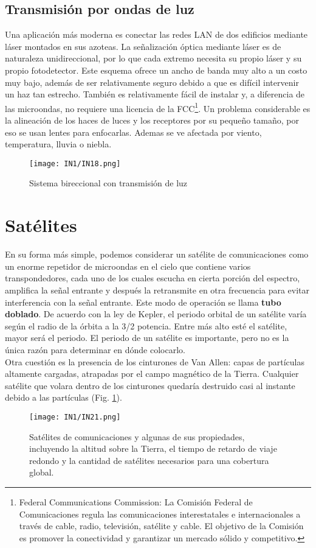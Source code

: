 \documentclass[
	12pt, %
	fleqn, %
	a4paper, %
	oneside, %
]{LegrandOrangeBook}
\begin{document}
\subsection{Transmisión por ondas de luz}
Una aplicación más moderna es conectar las redes LAN de dos edificios mediante láser montados en sus azoteas. La señalización óptica mediante láser es de naturaleza unidireccional, por lo que
cada extremo necesita su propio láser y su propio fotodetector. Este esquema ofrece un ancho de banda muy alto a un costo muy bajo, además de ser relativamente seguro debido a que es difícil intervenir un haz tan estrecho. También es relativamente fácil de instalar y, a diferencia de las microondas, no requiere una licencia de la FCC\footnote{Federal Communications Commission: La Comisión Federal de Comunicaciones regula las comunicaciones interestatales e internacionales a través de cable, radio, televisión, satélite y cable. El objetivo de la Comisión es promover la conectividad y garantizar un mercado sólido y competitivo.}. Un problema considerable es la alineación de los haces de luces y los receptores por su pequeño tamaño, por eso se usan lentes para enfocarlas. Ademas se ve afectada por viento, temperatura, lluvia o niebla.
\begin{figure}[H]
\centering
\texttt{[image: IN1/IN18.png]}
\caption{Sistema bireccional con transmisión de luz}
\end{figure}
\section{Satélites}
En su forma más simple, podemos considerar un satélite de comunicaciones como un enorme repetidor de microondas en el cielo que contiene varios transpondedores, cada uno de los cuales escucha en cierta porción del espectro, amplifica la señal entrante y después la retransmite en otra frecuencia para evitar interferencia con la señal entrante. Este modo de operación se llama \textbf{tubo doblado}. De acuerdo con la ley de Kepler, el periodo orbital de un satélite varía según el radio de la órbita a la 3/2 potencia. Entre más alto esté el satélite, mayor será el periodo. El periodo de un satélite es importante, pero no es la única razón para determinar en dónde colocarlo.\\
Otra cuestión es la presencia de los cinturones de Van Allen: capas de partículas altamente cargadas, atrapadas por el campo magnético de la Tierra. Cualquier satélite que volara dentro de los cinturones quedaría destruido casi al instante debido a las partículas (Fig. \ref{fig: satelites prop}).
\begin{figure}[]
\centering
\texttt{[image: IN1/IN21.png]}
\caption{Satélites de comunicaciones y algunas de sus propiedades, incluyendo la altitud sobre la Tierra, el tiempo de retardo de viaje redondo y la cantidad de satélites necesarios para una cobertura global.}
\label{fig: satelites prop}
\end{figure}
\end{document}
